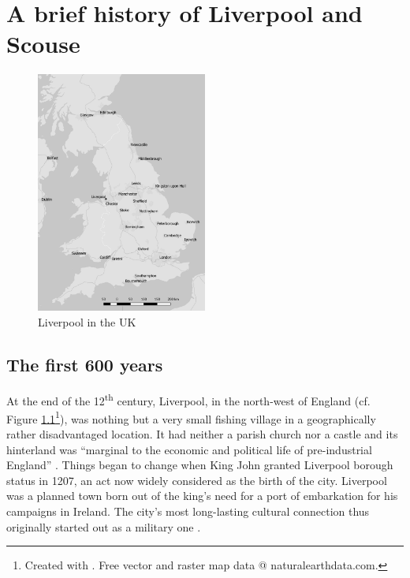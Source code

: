 \chapter{A brief history of Liverpool and Scouse}\label{ch.hist}

	\begin{figure}[h]
		\centering
 		\includegraphics[width=0.5\textwidth]{figures/Map-England.png}
		\caption{Liverpool in the UK}
		\label{fig.ex}
	\end{figure}

	\section{The first 600 years}\label{sec.hist.early}

At the end of the 12\textsuperscript{th} century, Liverpool, in the north-west of England (cf. Figure \ref{fig.ex}\footnote{Created with \cite{QGIS2016}. Free vector and raster map data @ naturalearthdata.com.}), was nothing but a very small fishing village in a geographically rather disadvantaged location.
It had neither a parish church nor a castle and its hinterland was ``marginal to the economic and political life of pre-industrial England'' \citep[59]{kermodeetal2006}.
Things began to change when King John granted Liverpool borough status in 1207, an act now widely considered as the birth of the city. 
Liverpool was a planned town born out of the king's need for a port of embarkation for his campaigns in Ireland.
The city's most long-lasting cultural connection thus originally started out as a military one \parencite[cf.][59--63]{kermodeetal2006}.


